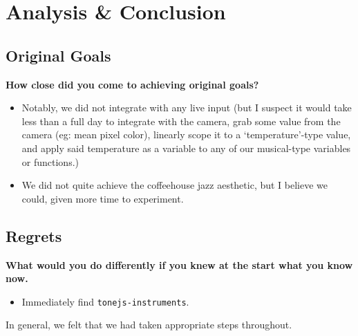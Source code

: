 \documentclass[12pt,a4paper]{article}
\newcommand{\lightcode}[1]{\colorbox{light-gray}{\texttt{#1}}}
\begin{document}
\pagebreak
\section{Analysis \& Conclusion}
\subsection{Original Goals}
\textbf{How close did you come to achieving original goals?}
\begin{itemize}
	\item Notably, we did not integrate with any live input (but I suspect it would take less than a full day to integrate with the camera, grab some value from the camera (eg: mean pixel color), linearly scope it to a `temperature'-type value, and apply said temperature as a variable to any of our musical-type variables or functions.)
	\item We did not quite achieve the coffeehouse jazz aesthetic, but I believe we could, given more time to experiment.
\end{itemize}

\subsection{Regrets}
\textbf{What would you do differently if you knew at the start what you know now.}
\begin{itemize}
	\item Immediately find \lightcode{tonejs-instruments}.
\end{itemize}

In general, we felt that we had taken appropriate steps throughout.
\end{document}
